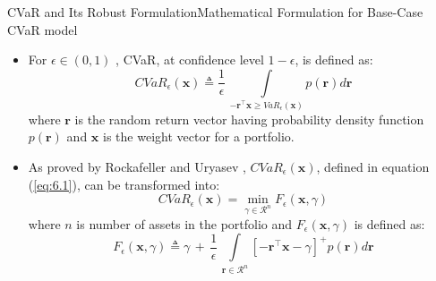 \documentclass{beamer}
\begin{document}
\begin{frame}{CVaR and Its Robust Formulation}{Mathematical Formulation for Base-Case CVaR model}
\begin{itemize}
    \item{ For $\epsilon \in (0,1)$ , CVaR, at confidence level $1-\epsilon$, is defined as:
\begin{equation}
\label{eq:6.1}
CVaR_{\epsilon}(\mathbf{x}) \triangleq \frac{1}{\epsilon} \, \int \limits_{-\mathbf{r}^{\top}\mathbf{x} \geq VaR_{\epsilon}(\mathbf{x})} p(\mathbf{r})  d\mathbf{r}
\end{equation}
where $\mathbf{r}$ is the random return vector having probability density function $p(\mathbf{r})$ and $\mathbf{x}$ is the weight vector for a portfolio.}

\item{As proved by Rockafeller and Uryasev \cite{rockafellar1}, $CVaR_{\epsilon}(\mathbf{x})$, defined in equation (\ref{eq:6.1}), can be transformed into: 
\begin{equation}
\label{eq:6.4}
CVaR_{\epsilon}(\mathbf{x}) = \min_{\gamma \in \mathcal{R}^{n}} F_{\epsilon}(\mathbf{x},\gamma)
\end{equation}
where $n$ is number of assets in the portfolio and $F_{\epsilon}(\mathbf{x},\gamma)$ is defined as:
\begin{equation}
\label{eq:6.5}
 F_{\epsilon}(\mathbf{x},\gamma) \triangleq \gamma \, + \, \frac{1}{\epsilon} \, \int \limits_{\mathbf{r} \in \mathcal{R}^{n}} [-\mathbf{r}^{\top}\mathbf{x}-\gamma]^{+} p(\mathbf{r})  d\mathbf{r}
\end{equation} }
\end{itemize}
\end{frame}
\end{document}
